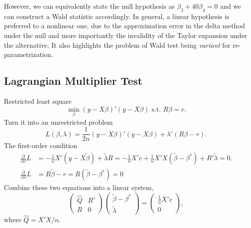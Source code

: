 \documentclass[11pt]{article}
\renewcommand{\hat}{\widehat}
\begin{document}
However, we can equivalently state the null hypothesis as
\(\beta_{3}+40\beta_{4}=0\) and we can construct a Wald statistic
accordingly. In general, a linear hypothesis is preferred to a nonlinear
one, due to the approximation error in the delta method under the null
and more importantly the invalidity of the Taylor expansion under the
alternative. It also highlights the problem of Wald test being
\emph{variant} for re-parametrization.

    \subsection{Lagrangian Multiplier
Test}\label{lagrangian-multiplier-test}

Restricted least square
\[\min_{\beta}\left(y-X\beta\right)'\left(y-X\beta\right)\mbox{ s.t. }R\beta=r.\]
Turn it into an unrestricted problem
\[L\left(\beta,\lambda\right)=\frac{1}{2n}\left(y-X\beta\right)'\left(y-X\beta\right)+\lambda'\left(R\beta-r\right).\]
The first-order condition 
\begin{align*}
\frac{\partial}{\partial\beta}L & =  -\frac{1}{n}X'\left(y-X\tilde{\beta}\right)+\tilde{\lambda}R=-\frac{1}{n}X'e+\frac{1}{n}X'X\left(\tilde{\beta}-\beta^{*}\right)+R'\tilde{\lambda}=0.\\
\frac{\partial}{\partial\lambda}L & =  R\tilde{\beta}-r=R\left(\tilde{\beta}-\beta^{*}\right)=0
\end{align*}
Combine these two equations into a linear system,
\[
\begin{pmatrix}
\widehat{Q} & R'\\
R & 0
\end{pmatrix}\begin{pmatrix}\tilde{\beta}-\beta^{*}\\
\tilde{\lambda}
\end{pmatrix}=\begin{pmatrix}\frac{1}{n}X'e\\
0
\end{pmatrix},\]
where $\hat{Q} = X'X/n$.
\end{document}
